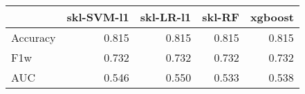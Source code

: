 \begin{tabular}{lrrrr}
\toprule
{} &  skl-SVM-l1 &  skl-LR-l1 &  skl-RF &  xgboost \\
\midrule
Accuracy &       0.815 &      0.815 &   0.815 &    0.815 \\
F1w      &       0.732 &      0.732 &   0.732 &    0.732 \\
AUC      &       0.546 &      0.550 &   0.533 &    0.538 \\
\bottomrule
\end{tabular}
